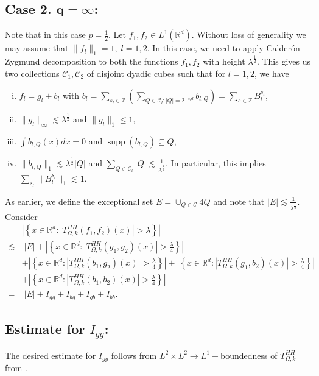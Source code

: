 \documentclass[a4paper,reqno]{amsart}
\newcommand{\R}{{\mathbb R}}       %
\newcommand{\Z}{{\mathbb Z}}
\newcommand{\supp}[1]{\operatorname{supp}(#1)}   %
\theoremstyle{definition}
\numberwithin{equation}{section}
\begin{document}
	\subsection*{Case 2. $\mathbf{q=\infty}$:} Note that in this case $p=\frac{1}{2}$. Let $f_1,f_2\in L^1(\R^d)$. Without loss of generality we may assume that $\|f_l\|_1=1,\;l=1,2$. In this case, we need to apply Calder\'on-Zygmund decomposition to both the functions $f_1,f_2$ with height $\lambda^\frac{1}{2}$. This gives us two collections $\mathcal{C}_1,\mathcal{C}_2$ of disjoint dyadic cubes such that for $l=1,2$, we have
	\begin{enumerate}[i)]
		\item $f_l=g_l+b_l$ with $b_l=\sum_{s_l\in\Z}\left(\sum_{Q\in\mathcal{C}_l:|Q|=2^{-s_ld}}b_{l,Q}\right)=\sum_{s\in\Z}B_l^{s_l}$,
		\item $\|g_l\|_\infty\lesssim\lambda^\frac{1}{2}$ and $\|g_l\|_{1}\leq1$,
		\item $\int b_{l,Q}(x)dx=0$ and $\supp{b_{l,Q}}\subseteq Q$,
		\item $\|b_{l,Q}\|_{1}\lesssim\lambda^{\frac{1}{2}}|Q|$ and $\sum_{Q\in\mathcal{C}_l}|Q|\lesssim\frac{1}{\lambda^{\frac{1}{2}}}$. In particular, this implies $\sum_{s_l}\|B_l^{s_l}\|_{1}\lesssim1$.
	\end{enumerate}
	As earlier, we define the exceptional set $E=\cup_{Q\in\mathcal{C}}4Q$ and note that $|E|\lesssim\frac{1}{\lambda^{\frac{1}{2}}}$. Consider
	\begin{align*}
		&\left|\left\{x\in \R^d:|T^{HH}_{\Omega,k}(f_1,f_2)(x)|>\lambda\right\}\right|\\
		\lesssim&\;|E|+\left|\left\{x\in \R^d:|T^{HH}_{\Omega,k}(g_1,g_2)(x)|>\frac{\lambda}{4}\right\}\right|\\
		&+\left|\left\{x\in \R^d:|T^{HH}_{\Omega,k}(b_1,g_2)(x)|>\frac{\lambda}{4}\right\}\right|+\left|\left\{x\in \R^d:|T^{HH}_{\Omega,k}(g_1,b_2)(x)|>\frac{\lambda}{4}\right\}\right|\\
		&+\left|\left\{x\in \R^d:|T^{HH}_{\Omega,k}(b_1,b_2)(x)|>\frac{\lambda}{4}\right\}\right|\\
		=&\;|E|+I_{gg}+I_{bg}+I_{gb}+I_{bb}.
	\end{align*}
	\subsection*{Estimate for $I_{gg}$:} The desired estimate for $I_{gg}$ follows from $L^2\times L^2\to L^1-$boundedness of $T_{\Omega,k}^{HH}$ from . 
\end{document}
